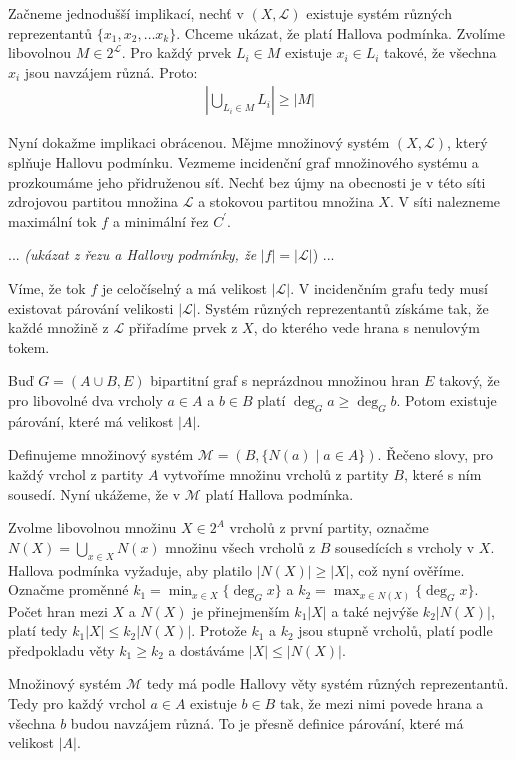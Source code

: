 \begin{t_proof}
  Začneme jednodušší implikací, nechť v $(X,\mathcal{L})$ existuje systém různých reprezentantů $\{x_1,x_2,\dots x_k\}$. Chceme ukázat, že platí Hallova podmínka. Zvolíme libovolnou $M\in2^\mathcal{L}$. Pro každý prvek $L_i\in M$ existuje $x_i\in L_i$ takové, že všechna $x_i$ jsou navzájem různá. Proto:
  \begin{align*}
    \left|\bigcup_{L_i\in M} L_i\right|\geq |M|
  \end{align*}
  
  Nyní dokažme implikaci obrácenou. Mějme množinový systém $(X,\mathcal{L})$, který splňuje Hallovu podmínku. Vezmeme incidenční graf množinového systému a prozkoumáme jeho přidruženou síť. Nechť bez újmy na obecnosti je v této síti zdrojovou partitou množina $\mathcal{L}$ a stokovou partitou množina $X$. V síti nalezneme maximální tok $f$ a minimální řez $C^\prime$.
  
  ... \textit{(ukázat z řezu a Hallovy podmínky, že} $|f|=|\mathcal{L}|$) ... %
  
  Víme, že tok $f$ je celočíselný a má velikost $|\mathcal{L}|$. V incidenčním grafu tedy musí existovat párování velikosti $|\mathcal{L}|$. Systém různých reprezentantů získáme tak, že každé množině z $\mathcal{L}$ přiřadíme prvek z $X$, do kterého vede hrana s nenulovým tokem.
\end{t_proof}

\begin{t_corollary}
  Buď $G=(A\cup B,E)$ bipartitní graf s neprázdnou množinou hran $E$ takový, že pro libovolné dva vrcholy $a\in A$ a $b\in B$ platí $\deg_G a\geq \deg_G b$. Potom existuje párování, které má velikost $|A|$. 
\end{t_corollary}

\begin{t_proof}
  Definujeme množinový systém $\mathcal{M}=(B,\{N(a)\mid a\in A\})$. Řečeno slovy, pro každý vrchol z partity $A$ vytvoříme množinu vrcholů z partity $B$, které s ním sousedí. Nyní ukážeme, že v $\mathcal{M}$ platí Hallova podmínka.
  
  Zvolme libovolnou množinu $X\in 2^A$ vrcholů z první partity, označme $N(X)=\bigcup_{x\in X}N(x)$ množinu všech vrcholů z $B$ sousedících s vrcholy v $X$. Hallova podmínka vyžaduje, aby platilo $|N(X)|\geq |X|$, což nyní ověříme. Označme proměnné $k_1=\min_{x\in X}\{\deg_G x\}$ a $k_2=\max_{x\in N(X)}\{\deg_G x\}$. Počet hran mezi $X$ a $N(X)$ je přinejmenším $k_1|X|$ a také nejvýše $k_2|N(X)|$, platí tedy $k_1|X|\leq k_2|N(X)|$. Protože $k_1$ a $k_2$ jsou stupně vrcholů, platí podle předpokladu věty $k_1\geq k_2$ a dostáváme $|X|\leq |N(X)|$.
  
  Množinový systém $\mathcal{M}$ tedy má podle Hallovy věty systém různých reprezentantů. Tedy pro každý vrchol $a\in A$ existuje $b\in B$ tak, že mezi nimi povede hrana a všechna $b$ budou navzájem různá. To je přesně definice párování, které má velikost $|A|$.
\end{t_proof}

